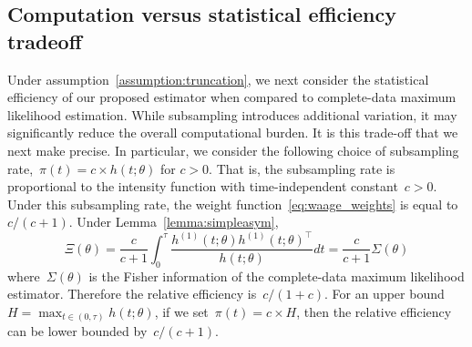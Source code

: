 \documentclass[12pt]{amsart}
\newtheorem{prop}[thm]{Proposition}
\begin{document}


\subsection{Computation versus statistical efficiency tradeoff}

Under assumption~\ref{assumption:truncation}, we next consider the statistical efficiency of our proposed estimator when compared to complete-data maximum likelihood estimation. While subsampling introduces additional variation, it may significantly reduce the overall computational burden. It is this trade-off that we next make precise. In particular, we consider the following choice of subsampling rate,~$\pi(t) = c \times h(t; \theta)$ for $c>0$. That is, the subsampling rate is proportional to the intensity function with time-independent constant~$c > 0$. Under this subsampling rate, the weight function~\eqref{eq:waage_weights} is equal to $c/ (c+1)$. Under Lemma~\ref{lemma:simpleasym},
\[
\Xi (\theta) = \frac{c}{c+1} \int_0^\tau \frac{ h^{(1)} (t; \theta)
  h^{(1)} (t; \theta)^\top}{h (t; \theta)} dt = \frac{c}{c+1} \Sigma (\theta)
\]
where~$\Sigma(\theta)$ is the Fisher information of the complete-data maximum likelihood estimator.
Therefore the relative efficiency is~$c/(1+c)$. For an upper bound~$H = \max_{t \in (0,\tau)} h(t;\theta)$, if we set~$\pi (t) = c \times H$, then the relative efficiency can be lower bounded by~$c / (c+1)$.
\end{document}
